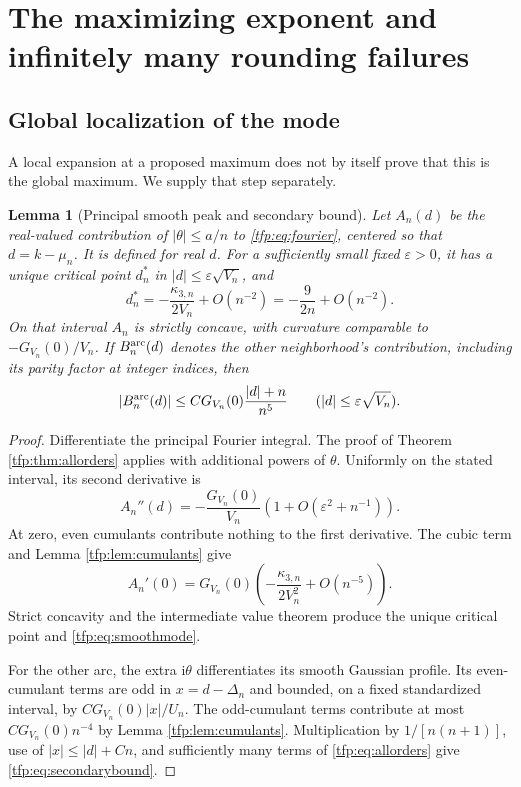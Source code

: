 \documentclass[11pt,a4paper]{article}
\numberwithin{equation}{section}
\newtheorem{lemma}[theorem]{Lemma}
\theoremstyle{definition}\newtheorem{definition}[theorem]{Definition}
\theoremstyle{remark}\newtheorem{remark}[theorem]{Remark}
\newcommand{\ii}{\mathrm i}
\begin{document}
\section{The maximizing exponent and infinitely many rounding failures}
\label{tfp:sec:modes}
\subsection{Global localization of the mode}
A local expansion at a proposed maximum does not by itself prove that
this is the global maximum. We supply that step separately.

\begin{lemma}[Principal smooth peak and secondary bound]\label{tfp:lem:smooth}
Let $A_n(d)$ be the real-valued contribution of $|\theta|\le a/n$ to
\eqref{tfp:eq:fourier}, centered so that $d=k-\mu_n$. It is defined for real
$d$. For a sufficiently small fixed $\varepsilon>0$, it has a unique
critical point $d_n^*$ in $|d|\le\varepsilon\sqrt{V_n}$, and
\begin{equation}\label{tfp:eq:smoothmode}
 d_n^*=-\frac{\kappa_{3,n}}{2V_n}+O(n^{-2})
       =-\frac9{2n}+O(n^{-2}).
\end{equation}
On that interval $A_n$ is strictly concave, with curvature comparable
to $-G_{V_n}(0)/V_n$. If $B_n^{\rm arc}(d)$ denotes the other
neighborhood's contribution, including its parity factor at integer
indices, then
\begin{equation}\label{tfp:eq:secondarybound}
 |B_n^{\rm arc}(d)|\le
 C G_{V_n}(0)\frac{|d|+n}{n^5}
 \qquad (|d|\le\varepsilon\sqrt{V_n}).
\end{equation}
\end{lemma}
\begin{proof}
Differentiate the principal Fourier integral. The proof of
Theorem \ref{tfp:thm:allorders} applies with additional powers of
$\theta$. Uniformly on the stated interval, its second derivative is
\[
 A_n''(d)=-\frac{G_{V_n}(0)}{V_n}
               (1+O(\varepsilon^2+n^{-1})).
\]
At zero, even cumulants contribute nothing to the first derivative.
The cubic term and Lemma \ref{tfp:lem:cumulants} give
\[
 A_n'(0)=G_{V_n}(0)
       \left(-\frac{\kappa_{3,n}}{2V_n^2}+O(n^{-5})\right).
\]
Strict concavity and the intermediate value theorem produce the unique
critical point and \eqref{tfp:eq:smoothmode}.

For the other arc, the extra $\ii\theta$ differentiates its smooth
Gaussian profile. Its even-cumulant terms are odd in $x=d-\Delta_n$
and bounded, on a fixed standardized interval, by
$C G_{V_n}(0)|x|/U_n$. The odd-cumulant terms contribute at most
$C G_{V_n}(0)n^{-4}$ by Lemma \ref{tfp:lem:cumulants}. Multiplication by
$1/[n(n+1)]$, use of $|x|\le|d|+Cn$, and sufficiently many terms of
\eqref{tfp:eq:allorders} give \eqref{tfp:eq:secondarybound}.
\end{proof}
\end{document}
